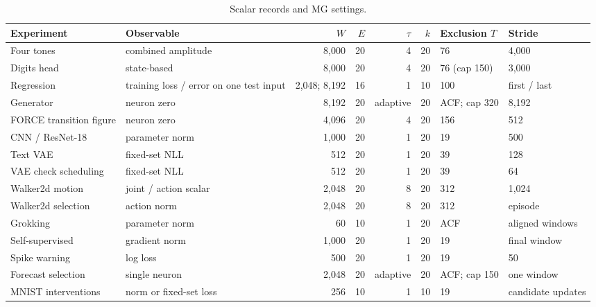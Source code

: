 {\begin{table}[htbp]
\centering\small
\caption{Scalar records and MG settings.}
\label{tab:mg-settings}
\begin{tabularx}{\linewidth}{@{}l>{\raggedright\arraybackslash}Xrrrrll@{}}
\toprule
Experiment & Observable & $W$ & $E$ & $\tau$ & $k$ & Exclusion $T$ & Stride \\
\midrule
Four tones & combined amplitude & 8,000 & 20 & 4 & 20 & 76 & 4,000 \\
Digits head & state-based & 8,000 & 20 & 4 & 20 & 76 (cap 150) & 3,000 \\
Regression & training loss / error on one test input & 2,048; 8,192 & 16 & 1 & 10 & 100 & first / last \\
Generator & neuron zero & 8,192 & 20 & adaptive & 20 & ACF; cap 320 & 8,192 \\
FORCE transition figure & neuron zero & 4,096 & 20 & 4 & 20 & 156 & 512 \\
CNN / ResNet-18 & parameter norm & 1,000 & 20 & 1 & 20 & 19 & 500 \\
Text VAE & fixed-set NLL & 512 & 20 & 1 & 20 & 39 & 128 \\
VAE check scheduling & fixed-set NLL & 512 & 20 & 1 & 20 & 39 & 64 \\
Walker2d motion & joint / action scalar & 2,048 & 20 & 8 & 20 & 312 & 1,024 \\
Walker2d selection & action norm & 2,048 & 20 & 8 & 20 & 312 & episode \\
Grokking & parameter norm & 60 & 10 & 1 & 20 & ACF & aligned windows \\
Self-supervised & gradient norm & 1,000 & 20 & 1 & 20 & 19 & final window \\
Spike warning & log loss & 500 & 20 & 1 & 20 & 19 & 50 \\
Forecast selection & single neuron & 2,048 & 20 & adaptive & 20 & ACF; cap 150 & one window \\
MNIST interventions & norm or fixed-set loss & 256 & 10 & 1 & 10 & 19 & candidate updates \\
\bottomrule
\end{tabularx}
\end{table}

}
